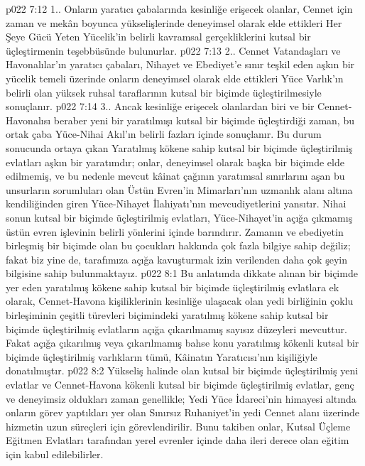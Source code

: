 \vs p022 7:12 1.\bibnobreakspace {}. Onların yaratıcı çabalarında kesinliğe erişecek olanlar, Cennet için zaman ve mekân boyunca yükselişlerinde deneyimsel olarak elde ettikleri Her Şeye Gücü Yeten Yücelik’in belirli kavramsal gerçekliklerini kutsal bir üçleştirmenin teşebbüsünde bulunurlar.
\vs p022 7:13 2.. Cennet Vatandaşları ve Havonalılar’ın yaratıcı çabaları, Nihayet ve Ebediyet’e sınır teşkil eden aşkın bir yücelik temeli üzerinde onların deneyimsel olarak elde ettikleri Yüce Varlık’ın belirli olan yüksek ruhsal taraflarının kutsal bir biçimde üçleştirilmesiyle sonuçlanır.
\vs p022 7:14 3.\bibnobreakspace {}. Ancak kesinliğe erişecek olanlardan biri ve bir Cennet\hyp{}Havonalısı beraber yeni bir yaratılmışı kutsal bir biçimde üçleştirdiği zaman, bu ortak çaba Yüce\hyp{}Nihai Akıl’ın belirli fazları içinde sonuçlanır. Bu durum sonucunda ortaya çıkan Yaratılmış kökene sahip kutsal bir biçimde üçleştirilmiş evlatları aşkın bir yaratımdır; onlar, deneyimsel olarak başka bir biçimde elde edilmemiş, ve bu nedenle mevcut kâinat çağının yaratımsal sınırlarını aşan bu unsurların sorumluları olan Üstün Evren’in Mimarları’nın uzmanlık alanı altına kendiliğinden giren Yüce\hyp{}Nihayet İlahiyatı’nın mevcudiyetlerini yansıtır. Nihai sonun kutsal bir biçimde üçleştirilmiş evlatları, Yüce\hyp{}Nihayet’in açığa çıkmamış üstün evren işlevinin belirli yönlerini içinde barındırır. Zamanın ve ebediyetin birleşmiş bir biçimde olan bu çocukları hakkında çok fazla bilgiye sahip değiliz; fakat biz yine de, tarafımıza açığa kavuşturmak izin verilenden daha çok şeyin bilgisine sahip bulunmaktayız.
\vs p022 8:1 Bu anlatımda dikkate alınan bir biçimde yer eden yaratılmış kökene sahip kutsal bir biçimde üçleştirilmiş evlatlara ek olarak, Cennet\hyp{}Havona kişiliklerinin kesinliğe ulaşacak olan yedi birliğinin çoklu birleşiminin çeşitli türevleri biçimindeki yaratılmış kökene sahip kutsal bir biçimde üçleştirilmiş evlatların açığa çıkarılmamış sayısız düzeyleri mevcuttur. Fakat açığa çıkarılmış veya çıkarılmamış bahse konu yaratılmış kökenli kutsal bir biçimde üçleştirilmiş varlıkların tümü, Kâinatın Yaratıcısı’nın kişiliğiyle donatılmıştır.
\vs p022 8:2 Yükseliş halinde olan kutsal bir biçimde üçleştirilmiş yeni evlatlar ve Cennet\hyp{}Havona kökenli kutsal bir biçimde üçleştirilmiş evlatlar, genç ve deneyimsiz oldukları zaman genellikle; Yedi Yüce İdareci’nin himayesi altında onların görev yaptıkları yer olan Sınırsız Ruhaniyet’in yedi Cennet alanı üzerinde hizmetin uzun süreçleri için görevlendirilir. Bunu takiben onlar, Kutsal Üçleme Eğitmen Evlatları tarafından yerel evrenler içinde daha ileri derece olan eğitim için kabul edilebilirler.

